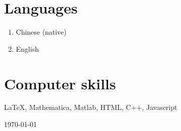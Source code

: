 \documentclass[margin]{res}
\begin{document}
\begin{resume}
\section{Languages}
\begin{enumerate}[--]
\item Chinese (native)
\item English 
\end{enumerate}

\section{Computer skills}
\LaTeX, Mathematica, Matlab, HTML, C++, Javascript
\end{resume}
\begin{flushright}
    \today
\end{flushright}
\end{document}
